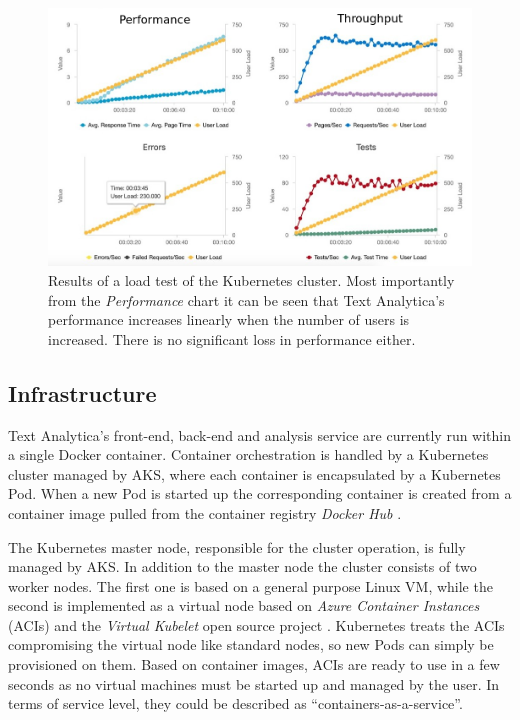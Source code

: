 \documentclass[conference]{IEEEtran}
\begin{document}
\begin{figure}[ht!]
\includegraphics[width=170mm]{img/loadtest_01.png}
\caption{Results of a load test of the Kubernetes cluster. Most importantly from the \textit{Performance} chart it can be seen that Text Analytica's performance increases linearly when the number of users is increased. There is no significant loss in performance either.}
\label{img:loadtesting}
\end{figure}

\subsection{Infrastructure}
\label{subsec:infra}
Text Analytica’s front-end, back-end and analysis service are currently run within a single Docker container. Container orchestration is handled by a Kubernetes cluster managed by AKS, where each container is encapsulated by a Kubernetes Pod. When a new Pod is started up the corresponding container is created from a container image pulled from the container registry \textit{Docker Hub} \cite{DockerHub}.

The Kubernetes master node, responsible for the cluster operation, is fully managed by AKS. In addition to the master node the cluster consists of two worker nodes. The first one is based on a general purpose Linux VM, while the second is implemented as a virtual node based on \textit{Azure Container Instances} (ACIs) \cite{AzureContainerInstances} and the \textit{Virtual Kubelet} open source project \cite{VirtualKubelet, VirtualKubeletGithub}. Kubernetes treats the ACIs compromising the virtual node like standard nodes, so new Pods can simply be provisioned on them. Based on container images, ACIs are ready to use in a few seconds as no virtual machines must be started up and managed by the user. In terms of service level, they could be described as “containers-as-a-service”.
\end{document}

